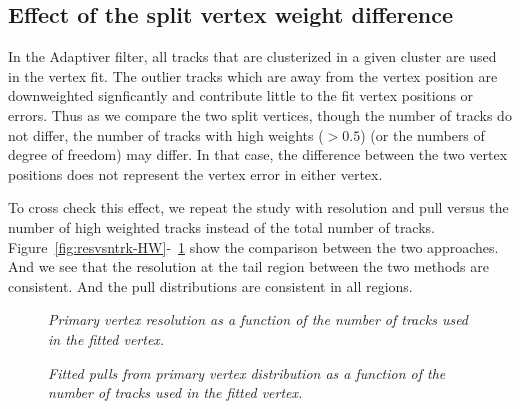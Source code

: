 \subsection{Effect of the split vertex weight difference}

In the Adaptiver filter, all tracks that are clusterized in a given cluster 
are used in the vertex fit. The outlier tracks which are away from 
the vertex position are downweighted signficantly and contribute 
little to the fit vertex positions or errors. 
Thus as we compare the two split vertices, though the number of tracks do not 
differ, the number of tracks with high weights ($>0.5$) (or the numbers of degree of freedom) may differ. 
In that case, the difference between the two vertex positions does not 
represent the vertex error in either vertex. 

To cross check this effect, we repeat the study with resolution 
and pull versus the number of high weighted tracks instead of the total number 
of tracks. 
Figure~\ref{fig:resvsntrk-HW}-~\ref{fig:pullvsntrk-HW} show the comparison 
between the two approaches. 
And we see that the resolution at the tail region between the two methods are consistent. 
And the pull distributions are consistent in all regions. 

\begin{figure}[htb]
\begin{center}
\centerline{
}
\caption{\sl
Primary vertex resolution as a function of the number of tracks used in the 
fitted vertex.
}
\label{fig:resvsntrk-HW}
\end{center}
\begin{center}
\centerline{
}
\caption{\sl
Fitted pulls from primary vertex distribution as a function of the number of tracks used in the 
fitted vertex.}
\label{fig:pullvsntrk-HW}
\end{center}
\end{figure}
